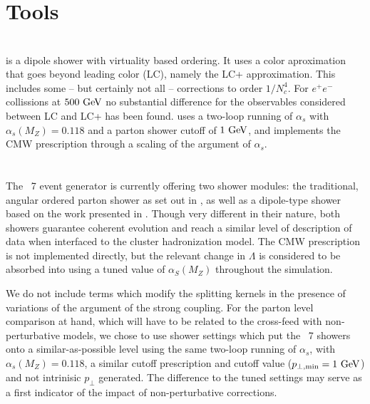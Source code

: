 \section{Tools}
\label{sec:psunc:tools}

\section{\Deductor}
\label{sec:psunc:tools:decuctor}

\Deductor \cite{Nagy:2014mqa,Nagy:2014oqa,Nagy:2014nqa,Nagy:2015hwa} is a
dipole shower with virtuality based ordering. It uses a color aproximation
that goes beyond leading color (LC), namely the LC+ approximation. This
includes some -- but certainly not all -- corrections to order $1/N_c^4$. For
$e^+e^-$ collissions at $500\ {\rm GeV}$ no substantial difference for the
observables considered between LC and LC+ has been found.  \Deductor uses a
two-loop running of $\alpha_s$ with $\alpha_s(M_Z)=0.118$ and a parton shower
cutoff of $1\ {\rm GeV}$, and implements the CMW prescription
\cite{Catani:1990rr} through a scaling of the argument of $\alpha_s$.

\section{\Herwig}
\label{sec:psunc:tools:herwig}

The \Herwig~7 event generator \cite{Bellm:2015jjp} is currently offering two
shower modules: the traditional, angular ordered parton shower as set out in
\cite{Gieseke:2003rz}, as well as a dipole-type shower based on the work
presented in \cite{Platzer:2009jq,Platzer:2011bc}.
Though very different in their nature, both showers guarantee coherent
evolution and reach a similar level of description of data when interfaced to
the cluster hadronization model. The CMW prescription \cite{Catani:1990rr} is
not implemented directly, but the relevant change in $\Lambda$ is considered
to be absorbed into using a tuned value of $\alpha_S(M_Z)$ throughout the
simulation.

We do not include terms which modify the splitting kernels in the presence of
variations of the argument of the strong coupling. For the parton level
comparison at hand, which will have to be related to the cross-feed with
non-perturbative models, we chose to use shower settings which put the
\Herwig~7 showers onto a similar-as-possible level using the same two-loop
running of $\alpha_s$, with $\alpha_s(M_Z)=0.118$, a similar cutoff
prescription and cutoff value ($p_{\perp,\text{min}}=1\ {\rm GeV}$) and not
intrinisic $p_\perp$ generated. The difference to the tuned settings may serve
as a first indicator of the impact of non-perturbative corrections.


